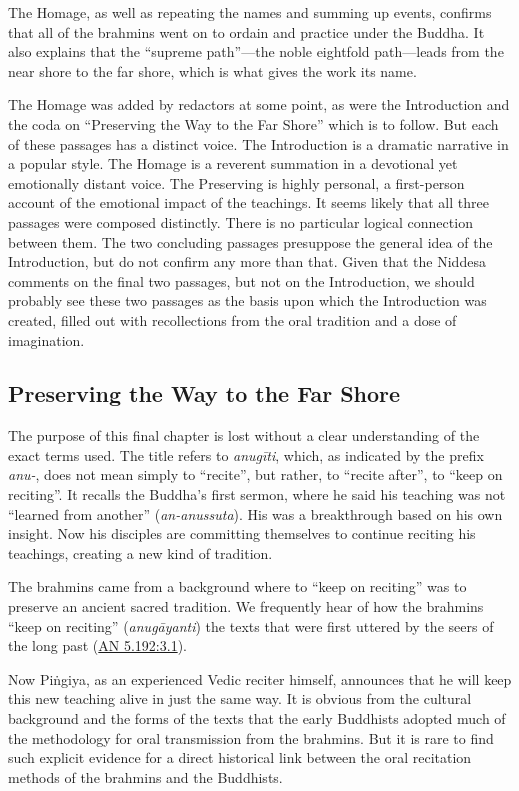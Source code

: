 \documentclass[12pt,openany]{book}%
\begin{document}
The Homage, as well as repeating the names and summing up events, confirms that all of the brahmins went on to ordain and practice under the Buddha. It also explains that the “supreme path”—the noble eightfold path—leads from the near shore to the far shore, which is what gives the work its name.

The Homage was added by redactors at some point, as were the Introduction and the coda on “Preserving the Way to the Far Shore” which is to follow. But each of these passages has a distinct voice. The Introduction is a dramatic narrative in a popular style. The Homage is a reverent summation in a devotional yet emotionally distant voice. The Preserving is highly personal, a first-person account of the emotional impact of the teachings. It seems likely that all three passages were composed distinctly. There is no particular logical connection between them. The two concluding passages presuppose the general idea of the Introduction, but do not confirm any more than that. Given that the Niddesa comments on the final two passages, but not on the Introduction, we should probably see these two passages as the basis upon which the Introduction was created, filled out with recollections from the oral tradition and a dose of imagination.

\subsection*{Preserving the Way to the Far Shore}

The purpose of this final chapter is lost without a clear understanding of the exact terms used. The title refers to \textit{\textsanskrit{anugīti}}, which, as indicated by the prefix \textit{anu-}, does not mean simply to “recite”, but rather, to “recite after”, to “keep on reciting”. It recalls the Buddha’s first sermon, where he said his teaching was not “learned from another” (\textit{an-anussuta}). His was a breakthrough based on his own insight. Now his disciples are committing themselves to continue reciting his teachings, creating a new kind of tradition.

The brahmins came from a background where to “keep on reciting” was to preserve an ancient sacred tradition. We frequently hear of how the brahmins “keep on reciting” (\textit{\textsanskrit{anugāyanti}}) the texts that were first uttered by the seers of the long past (\href{https://suttacentral.net/an5.192/en/sujato\#3.1}{AN 5.192:3.1}).

Now \textsanskrit{Piṅgiya}, as an experienced Vedic reciter himself, announces that he will keep this new teaching alive in just the same way. It is obvious from the cultural background and the forms of the texts that the early Buddhists adopted much of the methodology for oral transmission from the brahmins. But it is rare to find such explicit evidence for a direct historical link between the oral recitation methods of the brahmins and the Buddhists.
\end{document}
